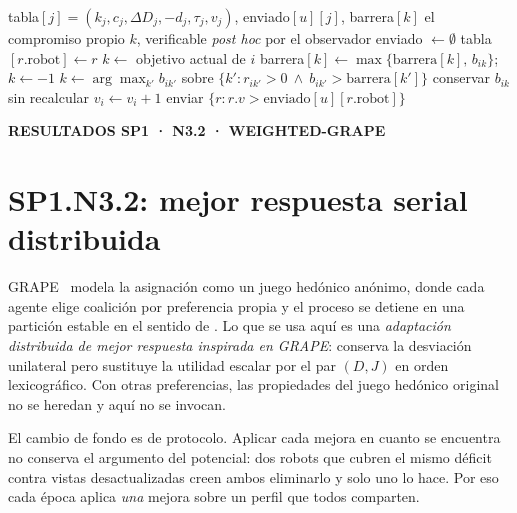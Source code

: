 \documentclass[12pt,a4paper]{article}
\newcommand{\leveltag}[1]{%
  \noindent\colorbox{VIUDark}{%
    \parbox{\dimexpr\textwidth-2\fboxsep\relax}{%
      \color{white}\sffamily\bfseries\small #1%
    }%
  }\par\smallskip
}
\begin{document}
\begin{algorithm}[H]
\caption{Capacity-CBBA-RB: ronda $t$ del robot $i$.}
\label{alg:n3-cbba}
\begin{algorithmic}[1]
\Require tabla$[j]=(k_j,c_j,\Delta D_j,-d_j,\tau_j,v_j)$, enviado$[u][j]$, barrera$[k]$
\Ensure el compromiso propio $k$, verificable \emph{post hoc} por el observador
 enviado $\gets \emptyset$
\EndIf
{}
    tabla$[r.\text{robot}] \gets r$
  \EndIf
\EndFor
\State $k \gets$ objetivo actual de $i$
  \State barrera$[k] \gets \max\{\text{barrera}[k],\, b_{ik}\}$;\quad $k \gets -1$
\EndIf
{}
  \State $k \gets \arg\max_{k'} b_{ik'}$ sobre $\{k' : r_{ik'} > 0 \ \wedge\ b_{ik'} > \text{barrera}[k']\}$
\Else
  \State conservar $b_{ik}$ sin recalcular 
\EndIf
{} $v_i \gets v_i + 1$ \EndIf
{} enviar $\{r : r.v > \text{enviado}[u][r.\text{robot}]\}$ \EndFor
\end{algorithmic}
\end{algorithm}


\clearpage

\leveltag{RESULTADOS SP1 · N3.2 · WEIGHTED-GRAPE}
\section*{SP1.N3.2: mejor respuesta serial distribuida}

GRAPE~\parencite{jangShinTsourdos2018GRAPE} modela la asignación como un juego
hedónico anónimo, donde cada agente elige coalición por preferencia propia y el
proceso se detiene en una partición estable en el sentido de
\textcite{bogomolnaiaJackson2002Hedonic}. Lo que se usa aquí es una
\emph{adaptación distribuida de mejor respuesta inspirada en GRAPE}: conserva la
desviación unilateral pero sustituye la utilidad escalar por el par $(D,J)$ en
orden lexicográfico. Con otras preferencias, las propiedades del juego hedónico
original no se heredan y aquí no se invocan.

El cambio de fondo es de protocolo. Aplicar cada mejora en cuanto se encuentra
no conserva el argumento del potencial: dos robots que cubren el mismo déficit
contra vistas desactualizadas creen ambos eliminarlo y solo uno lo hace. Por eso
cada época aplica \emph{una} mejora sobre un perfil que todos comparten.
\end{document}

